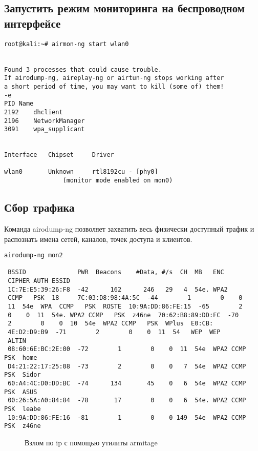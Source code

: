 \documentclass[utf8x, 12pt]{G7-32}
\begin{document}
\subsection{Запустить режим мониторинга на беспроводном интерфейсе}

\begin{lstlisting}
root@kali:~# airmon-ng start wlan0


Found 3 processes that could cause trouble.
If airodump-ng, aireplay-ng or airtun-ng stops working after
a short period of time, you may want to kill (some of) them!
-e 
PID	Name
2192	dhclient
2196	NetworkManager
3091	wpa_supplicant


Interface	Chipset		Driver

wlan0		Unknown 	rtl8192cu - [phy0]
				(monitor mode enabled on mon0)
\end{lstlisting}



\subsection{Сбор трафика}

Команда airodump-ng позволяет захватить весь физически доступный трафик и распознать имена сетей, каналов, точек доступа и клиентов. 

\begin{lstlisting}
airodump-ng mon2

 BSSID              PWR  Beacons    #Data, #/s  CH  MB   ENC  
 CIPHER AUTH ESSID                                                                                  
 1C:7E:E5:39:26:F8  -42      162      246   29   4  54e. WPA2 
 CCMP   PSK  18     7C:03:D8:98:4A:5C  -44        1        0    0  
 11  54e  WPA  CCMP   PSK  ROSTE  10:9A:DD:86:FE:15  -65        2        
 0    0  11  54e. WPA2 CCMP   PSK  z46ne  70:62:B8:89:DD:FC  -70        
 2        0    0  10  54e  WPA2 CCMP   PSK  WPlus  E0:CB:
 4E:D2:D9:B9  -71        2        0    0  11  54   WEP  WEP         
 ALTIN 
 08:60:6E:BC:2E:00  -72        1        0    0  11  54e  WPA2 CCMP   PSK  home  
 D4:21:22:17:25:08  -73        2        0    0   7  54e  WPA2 CCMP   PSK  Sidor 
 60:A4:4C:D0:DD:BC  -74      134       45    0   6  54e  WPA2 CCMP   PSK  ASUS  
 00:26:5A:A0:84:84  -78       17        0    0   6  54e. WPA2 CCMP   PSK  leabe 
 10:9A:DD:86:FE:16  -81        1        0    0 149  54e  WPA2 CCMP   PSK  z46ne  
\end{lstlisting}


\begin{figure}[hhh!]
	\begin{center}
	\end{center}
	\vspace{-5mm}\caption{Взлом по ip с помощью утилиты armitage}
\end{figure}
\end{document}
